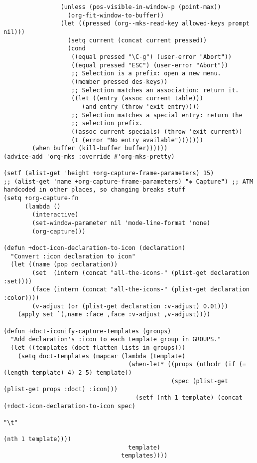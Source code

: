 \documentclass[11pt]{article}
\begin{document}
\begin{verbatim}
                (unless (pos-visible-in-window-p (point-max))
                  (org-fit-window-to-buffer))
                (let ((pressed (org--mks-read-key allowed-keys prompt nil)))
                  (setq current (concat current pressed))
                  (cond
                   ((equal pressed "\C-g") (user-error "Abort"))
                   ((equal pressed "ESC") (user-error "Abort"))
                   ;; Selection is a prefix: open a new menu.
                   ((member pressed des-keys))
                   ;; Selection matches an association: return it.
                   ((let ((entry (assoc current table)))
                      (and entry (throw 'exit entry))))
                   ;; Selection matches a special entry: return the
                   ;; selection prefix.
                   ((assoc current specials) (throw 'exit current))
                   (t (error "No entry available")))))))
        (when buffer (kill-buffer buffer))))))
(advice-add 'org-mks :override #'org-mks-pretty)

(setf (alist-get 'height +org-capture-frame-parameters) 15)
;; (alist-get 'name +org-capture-frame-parameters) "❖ Capture") ;; ATM hardcoded in other places, so changing breaks stuff
(setq +org-capture-fn
      (lambda ()
        (interactive)
        (set-window-parameter nil 'mode-line-format 'none)
        (org-capture)))

(defun +doct-icon-declaration-to-icon (declaration)
  "Convert :icon declaration to icon"
  (let ((name (pop declaration))
        (set  (intern (concat "all-the-icons-" (plist-get declaration :set))))
        (face (intern (concat "all-the-icons-" (plist-get declaration :color))))
        (v-adjust (or (plist-get declaration :v-adjust) 0.01)))
    (apply set `(,name :face ,face :v-adjust ,v-adjust))))

(defun +doct-iconify-capture-templates (groups)
  "Add declaration's :icon to each template group in GROUPS."
  (let ((templates (doct-flatten-lists-in groups)))
    (setq doct-templates (mapcar (lambda (template)
                                   (when-let* ((props (nthcdr (if (= (length template) 4) 2 5) template))
                                               (spec (plist-get (plist-get props :doct) :icon)))
                                     (setf (nth 1 template) (concat (+doct-icon-declaration-to-icon spec)
                                                                    "\t"
                                                                    (nth 1 template))))
                                   template)
                                 templates))))


\end{verbatim}
\end{document}
